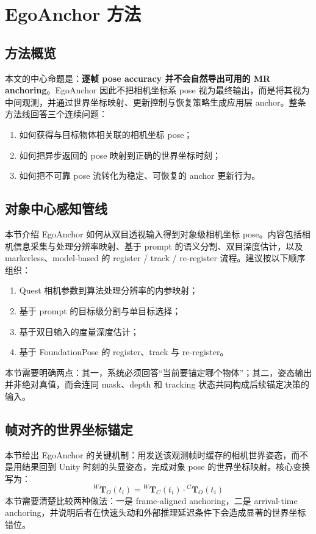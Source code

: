 \documentclass[review]{vgtc}
\begin{document}
\section{EgoAnchor 方法}

\subsection{方法概览}
本文的中心命题是：\textbf{逐帧 pose accuracy 并不会自然导出可用的 MR anchoring}。EgoAnchor 因此不把相机坐标系 pose 视为最终输出，而是将其视为中间观测，并通过世界坐标映射、更新控制与恢复策略生成应用层 anchor。整条方法线回答三个连续问题：
\begin{enumerate}
  \item 如何获得与目标物体相关联的相机坐标 pose；
  \item 如何把异步返回的 pose 映射到正确的世界坐标时刻；
  \item 如何把不可靠 pose 流转化为稳定、可恢复的 anchor 更新行为。
\end{enumerate}

\subsection{对象中心感知管线}
本节介绍 EgoAnchor 如何从双目透视输入得到对象级相机坐标 pose。内容包括相机信息采集与处理分辨率映射、基于 prompt 的语义分割、双目深度估计，以及 markerless、model-based 的 register / track / re-register 流程。建议按以下顺序组织：
\begin{enumerate}
  \item Quest 相机参数到算法处理分辨率的内参映射；
  \item 基于 prompt 的目标级分割与单目标选择；
  \item 基于双目输入的度量深度估计；
  \item 基于 FoundationPose 的 register、track 与 re-register。
\end{enumerate}
本节需要明确两点：其一，系统必须回答“当前要锚定哪个物体”；其二，姿态输出并非绝对真值，而会连同 mask、depth 和 tracking 状态共同构成后续锚定决策的输入。

\subsection{帧对齐的世界坐标锚定}
本节给出 EgoAnchor 的关键机制：用发送该观测帧时缓存的相机世界姿态，而不是用结果回到 Unity 时刻的头显姿态，完成对象 pose 的世界坐标映射。核心变换写为：
\[
{}^{W}\mathbf{T}_{O}(t_i) = {}^{W}\mathbf{T}_{C}(t_i) \cdot {}^{C}\mathbf{T}_{O}(t_i)
\]
本节需要清楚比较两种做法：一是 frame-aligned anchoring，二是 arrival-time anchoring，并说明后者在快速头动和外部推理延迟条件下会造成显著的世界坐标错位。
\end{document}
